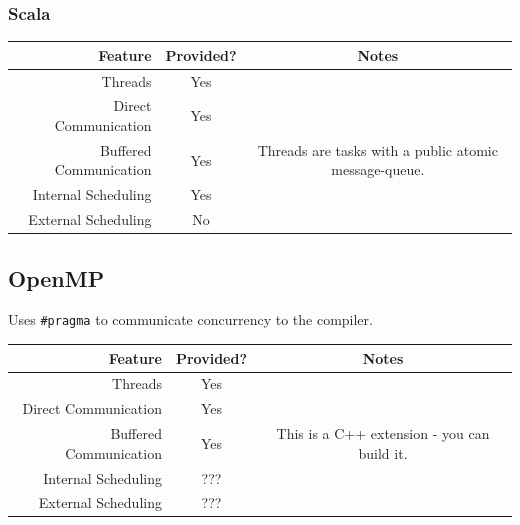                 \subsubsection{Scala} %
                \label{ssub:scala}
                    \begin{table}[h]
                        \label{tbl:scala}
                        \centering
                        \begin{tabular}{| r || c | c |}
                            \hline
                            Feature                 & Provided? & Notes \\ \hline \hline
                            Threads                 & Yes & \\ \hline
                            Direct Communication    & Yes & \\ \hline
                            Buffered Communication  & Yes & Threads are tasks with a public atomic message-queue. \\ \hline
                            Internal Scheduling     & Yes & \\ \hline
                            External Scheduling     & No & \\ \hline
                        \end{tabular}
                    \end{table}
            \subsection{OpenMP} %
            \label{sub:openmp}
                Uses \verb|#pragma| to communicate concurrency to the compiler.
                \begin{table}[h]
                    \label{tbl:open_mp}
                    \centering
                    \begin{tabular}{| r || c | c |}
                        \hline
                        Feature                 & Provided? & Notes \\ \hline \hline
                        Threads                 & Yes & \\ \hline
                        Direct Communication    & Yes & \\ \hline
                        Buffered Communication  & Yes & This is a C++ extension - you can build it. \\ \hline
                        Internal Scheduling     & ??? & \\ \hline
                        External Scheduling     & ??? & \\ \hline
                    \end{tabular}
                \end{table}
